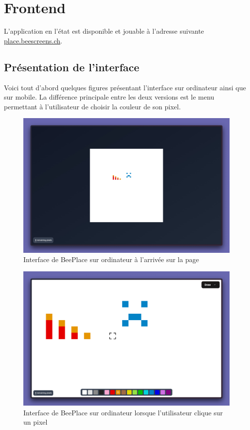 \section{Frontend}

L'application en l'état est disponible et jouable à l'adresse suivante \href{https://place.beescreens.ch}{place.beescreens.ch}.

\subsection{Présentation de l'interface}

Voici tout d'abord quelques figures présentant l'interface sur ordinateur ainsi que sur mobile. La différence principale entre les deux versions est le menu permettant à l'utilisateur de choisir la couleur de son pixel.


\begin{figure}[H]
  \centering
  \includegraphics[width=1\textwidth]{./assets/figures/screenshot-app-1.jpeg}
  \caption{Interface de BeePlace sur ordinateur à l'arrivée sur la page}
  \label{fig:screenshot-app-1}
\end{figure}

\begin{figure}[H]
  \centering
  \includegraphics[width=1\textwidth]{./assets/figures/screenshot-app-2.png}
  \caption{Interface de BeePlace sur ordinateur lorsque l'utilisateur clique sur un pixel}
  \label{fig:screenshot-app-2}
\end{figure}

